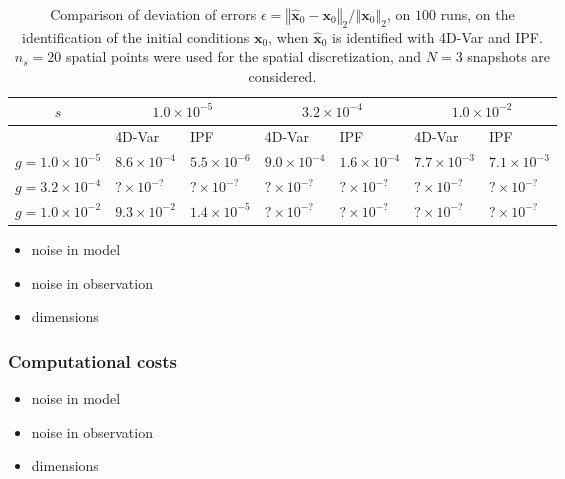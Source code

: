 \documentclass[aip,pof,nofootinbib,reprint,onecolumn]{revtex4-1}
\newcommand{\gras}[1]{\boldsymbol{#1}}
\newcommand{\norme}[1]{\left\Vert #1\right\Vert_2}
\newcommand{\Nsnap}{N} %
\newcommand{\Ns}{n_s} %
\newcommand{\point}{\gras{x}} %
\newcommand{\error}{\epsilon} %
\begin{document}
\begin{table}[h!]
\caption{
Comparison of deviation of errors $\error = \norme{\hat{\point}_0-\point_0}/\norme{\point_0}$, on $100$ runs, on the identification of the initial conditions $\point_0$, when $\hat{\point}_0$ is identified with 4D-Var and IPF. $\Ns=20$ spatial points were used for the spatial discretization, and $\Nsnap = 3$ snapshots are considered.
}
\begin{centering}
\begin{tabular}{c|ll|ll|ll}
$s$  & \multicolumn{2}{|c}{ $ 1.0\times 10^{-5} $ } & \multicolumn{2}{|c}{ $ 3.2\times 10^{-4} $ } & \multicolumn{2}{|c}{ $ 1.0\times 10^{-2} $ }  \\ 
\hline 
  & {\scriptsize 4D-Var} & {\scriptsize IPF} & {\scriptsize 4D-Var} & {\scriptsize IPF} & {\scriptsize 4D-Var} & {\scriptsize IPF} \\ 
\hline 
$ g=      1.0\times 10^{-5}$ & $8.6\times 10^{-4}$ & $5.5\times 10^{-6}$ & $9.0\times 10^{-4}$ & $1.6\times 10^{-4}$ & $7.7\times 10^{-3}$ & $7.1\times 10^{-3}$ \\ 
$g=      3.2\times 10^{-4} $ & $?\times 10^{-?}$ & $?\times 10^{-?}$ & $?\times 10^{-?}$ & $?\times 10^{-?}$ & $?\times 10^{-?}$ & $?\times 10^{-?}$ \\ 
$ g=      1.0\times 10^{-2}$ & $9.3\times 10^{-2}$ & $1.4\times 10^{-5}$ & $?\times 10^{-?}$ & $?\times 10^{-?}$ & $?\times 10^{-?}$ & $?\times 10^{-?}$ \\ 
\end{tabular}
\label{tab-std_errors_burgers}
\end{centering}
\end{table}


\begin{itemize}
\item noise in model
\item noise in observation
\item dimensions
\end{itemize}
\subsubsection{Computational costs}
\begin{itemize}
\item noise in model
\item noise in observation
\item dimensions
\end{itemize}
\end{document}
